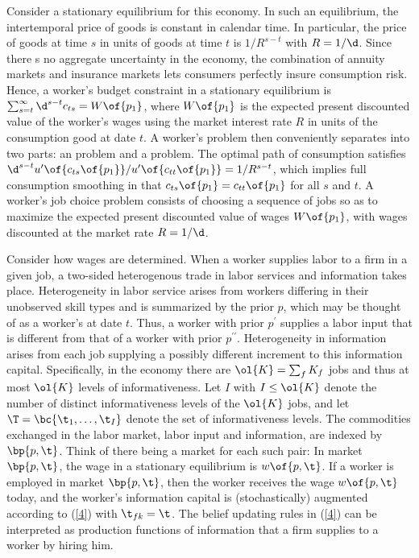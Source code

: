 \documentclass[12pt]{article}
\newcommand{\highlightB}[1]{{\emph{\color{MyBlue}{#1}}}}
\theoremstyle{definition}
\begin{document}
Consider a stationary equilibrium for this economy. In such an equilibrium, the intertemporal price of goods is constant in calendar time. In particular, the price of goods at time $s$ in units of goods at time $t$ is $1/R^{s-t}$ with $R = 1/\d$. Since there s no aggregate uncertainty in the economy, the combination of annuity markets and insurance markets lets consumers perfectly insure consumption risk. Hence, a worker's budget constraint in a stationary equilibrium is $\sum_{s=t}^{\infty}\d^{s-t} c_{ts} = W\of{p_1}$, where $W\of{p_1}$ is the expected present discounted value of the worker's wages using the market interest rate $R$ in units of the consumption good at date $t$. A worker's problem then conveniently separates into two parts: an \highlightB{intertemporal consumption} problem and a \highlightB{job choice} problem. The optimal path of consumption satisfies $\d^{s-t} u^\prime\of{c_{ts}\of{p_1}}/u^\prime\of{c_{tt}\of{p_1}} = 1/R^{s-t}$, which implies full consumption smoothing in that $c_{ts}\of{p_1} = c_{tt}\of{p_1}$ for all $s$ and $t$. A worker's job choice problem consists of choosing a sequence of jobs so as to maximize the expected present discounted value of wages $W\of{p_1}$, with wages discounted at the market rate $R = 1/\d$.

Consider how wages are determined. When a worker supplies labor to a firm in a given job, a two-sided heterogenous trade in labor services and information takes place. Heterogeneity in labor service arises from workers differing in their unobserved skill types and is summarized by the prior $p$, which may be thought of as a worker's \highlightB{information capital} at date $t$. Thus, a worker with prior $p^\prime$ supplies a labor input that is different from that of a worker with prior $p^{\prime\prime}$. Heterogeneity in information arises from each job supplying a possibly different increment to this information capital. Specifically, in the economy there are $\ol{K} = \sum_f K_f$ jobs and thus at most $\ol{K}$ levels of informativeness. Let $I$ with $I \leq \ol{K}$ denote the number of distinct informativeness levels of the $\ol{K}$ jobs, and let $\T = \bc{\t_1, \ldots, \t_I}$ denote the set of informativeness levels. The commodities exchanged in the labor market, labor input and information, are indexed by $\bp{p, \t}$. Think of there being a market for each such pair: In market $\bp{p, \t}$, the wage in a stationary equilibrium is $w\of{p, \t}$. If a worker is employed in market $\bp{p, \t}$, then the worker receives the wage $w\of{p, \t}$ today, and the worker's information capital is (stochastically) augmented according to (\ref{4}) with $\t_{fk} = \t$. The belief updating rules in (\ref{4}) can be interpreted as production functions of information that a firm supplies to a worker by hiring him.
\end{document}
